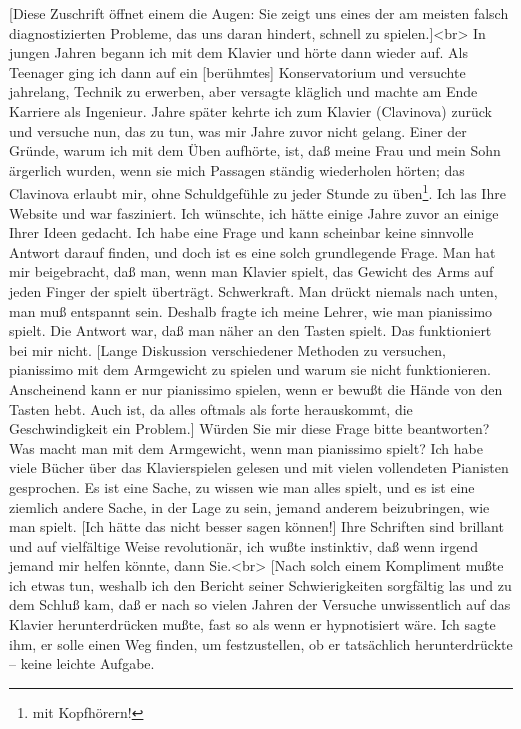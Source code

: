 \item \label{testimonials06}
[Diese Zuschrift öffnet einem die Augen: Sie zeigt uns eines der am meisten falsch diagnostizierten Probleme, das uns daran hindert, schnell zu spielen.]<br>
In jungen Jahren begann ich mit dem Klavier und hörte dann wieder auf.
Als Teenager ging ich dann auf ein [berühmtes] Konservatorium und versuchte jahrelang, Technik zu erwerben, aber versagte kläglich und machte am Ende Karriere als Ingenieur.
Jahre später kehrte ich zum Klavier (Clavinova) zurück und versuche nun, das zu tun, was mir Jahre zuvor nicht gelang.
Einer der Gründe, warum ich mit dem Üben aufhörte, ist, daß meine Frau und mein Sohn ärgerlich wurden, wenn sie mich Passagen ständig wiederholen hörten; das Clavinova erlaubt mir, ohne Schuldgefühle zu jeder Stunde zu üben\footnote{mit Kopfhörern!}.
Ich las Ihre Website und war fasziniert.
Ich wünschte, ich hätte einige Jahre zuvor an einige Ihrer Ideen gedacht.
Ich habe eine Frage und kann scheinbar keine sinnvolle Antwort darauf finden, und doch ist es eine solch grundlegende Frage.
Man hat mir beigebracht, daß man, wenn man Klavier spielt, das Gewicht des Arms auf jeden Finger der spielt überträgt.
Schwerkraft.
Man drückt niemals nach unten, man muß entspannt sein.
Deshalb fragte ich meine Lehrer, wie man pianissimo spielt.
Die Antwort war, daß man näher an den Tasten spielt.
Das funktioniert bei mir nicht.
[Lange Diskussion verschiedener Methoden zu versuchen, pianissimo mit dem Armgewicht zu spielen und warum sie nicht funktionieren.
Anscheinend kann er nur pianissimo spielen, wenn er bewußt die Hände von den Tasten hebt.
Auch ist, da alles oftmals als forte herauskommt, die Geschwindigkeit ein Problem.]
Würden Sie mir diese Frage bitte beantworten?
Was macht man mit dem Armgewicht, wenn man pianissimo spielt?
Ich habe viele Bücher über das Klavierspielen gelesen und mit vielen vollendeten Pianisten gesprochen.
Es ist eine Sache, zu wissen wie man alles spielt, und es ist eine ziemlich andere Sache, in der Lage zu sein, jemand anderem beizubringen, wie man spielt.
[Ich hätte das nicht besser sagen können!]
Ihre Schriften sind brillant und auf vielfältige Weise revolutionär, ich wußte instinktiv, daß wenn irgend jemand mir helfen könnte, dann Sie.<br>
[Nach solch einem Kompliment mußte ich etwas tun, weshalb ich den Bericht seiner Schwierigkeiten sorgfältig las und zu dem Schluß kam, daß er nach so vielen Jahren der Versuche unwissentlich auf das Klavier herunterdrücken mußte, fast so als wenn er hypnotisiert wäre.
Ich sagte ihm, er solle einen Weg finden, um festzustellen, ob er tatsächlich herunterdrückte -- keine leichte Aufgabe.
